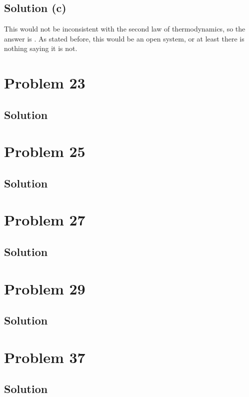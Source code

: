 \documentclass[12pt]{article}
\begin{document}
        \subsection{Solution (c)}
            This would not be inconsistent with the second law of thermodynamics, so the answer is .
            As stated before, this would be an open system, or at least there is nothing saying it is not.

    \pagebreak
    \section{Problem 23}

        \subsection{Solution}

    \pagebreak
    \section{Problem 25}

        \subsection{Solution}

    \pagebreak
    \section{Problem 27}

        \subsection{Solution}

    \pagebreak
    \section{Problem 29}

        \subsection{Solution}

    \pagebreak
    \section{Problem 37}

        \subsection{Solution}
\end{document}
